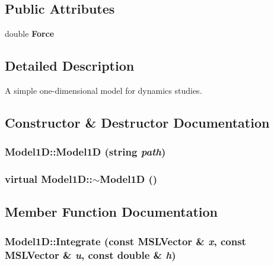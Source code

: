 \subsection*{Public Attributes}
\begin{CompactItemize}
\item 
double {\bf Force}
\end{CompactItemize}


\subsection{Detailed Description}
A simple one-dimensional model for dynamics studies.



\subsection{Constructor \& Destructor Documentation}
\subsubsection{\setlength{\rightskip}{0pt plus 5cm}Model1D::Model1D (string {\em path})}\label{classModel1D_a0}


\subsubsection{\setlength{\rightskip}{0pt plus 5cm}virtual Model1D::$\sim$Model1D ()\hspace{0.3cm}{\tt  [inline, virtual]}}\label{classModel1D_a1}




\subsection{Member Function Documentation}
\subsubsection{ Model1D::Integrate (const {\bf MSLVector} \& {\em x}, const {\bf MSLVector} \& {\em u}, const double \& {\em h})\hspace{0.3cm}{\tt  [virtual]}}\label{classModel1D_a3}


